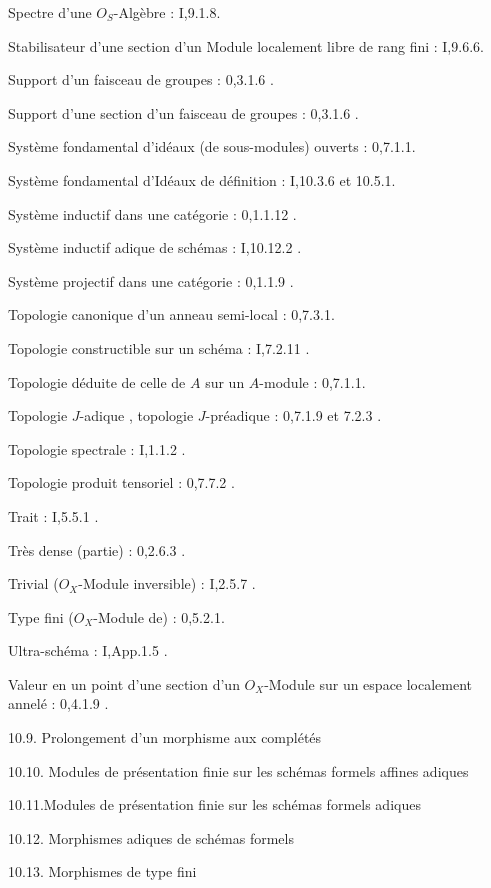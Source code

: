 Spectre d'une $O_S$-Algèbre : I,9.1.8.

Stabilisateur d'une section d'un Module localement libre de rang fini : I,9.6.6.

Support d'un faisceau de groupes :  0,3.1.6 .

Support d'une section d'un faisceau de groupes : 0,3.1.6 .

Système fondamental d'idéaux (de sous-modules) ouverts : 0,7.1.1.

Système fondamental d'Idéaux de définition : I,10.3.6 et 10.5.1.

Système inductif dans une catégorie : 0,1.1.12 .

Système inductif adique de schémas : I,10.12.2 .

Système projectif dans une catégorie : 0,1.1.9 .

Topologie canonique d'un anneau semi-local : 0,7.3.1.

Topologie constructible sur un schéma :  I,7.2.11 .

Topologie déduite de celle de $A$ sur un $A$-module : 0,7.1.1.

Topologie $J$-adique , topologie $J$-préadique : 0,7.1.9 et 7.2.3 .

Topologie spectrale : I,1.1.2 .

Topologie produit tensoriel : 0,7.7.2 .

Trait : I,5.5.1 .

Très dense (partie) : 0,2.6.3 .

Trivial ($O_X$-Module inversible) : I,2.5.7 .

Type fini ($O_X$-Module de) : 0,5.2.1.

Ultra-schéma : I,App.1.5 .

Valeur en un point d'une section d'un $O_X$-Module sur un espace localement annelé : 0,4.1.9 .


10.9. Prolongement d'un morphisme aux complétés\dotfill

10.10. Modules de présentation finie sur les schémas formels affines adiques\dotfill

10.11.Modules de présentation finie sur les schémas formels adiques\dotfill

10.12. Morphismes adiques de schémas formels\dotfill

10.13. Morphismes de type fini\dotfill

